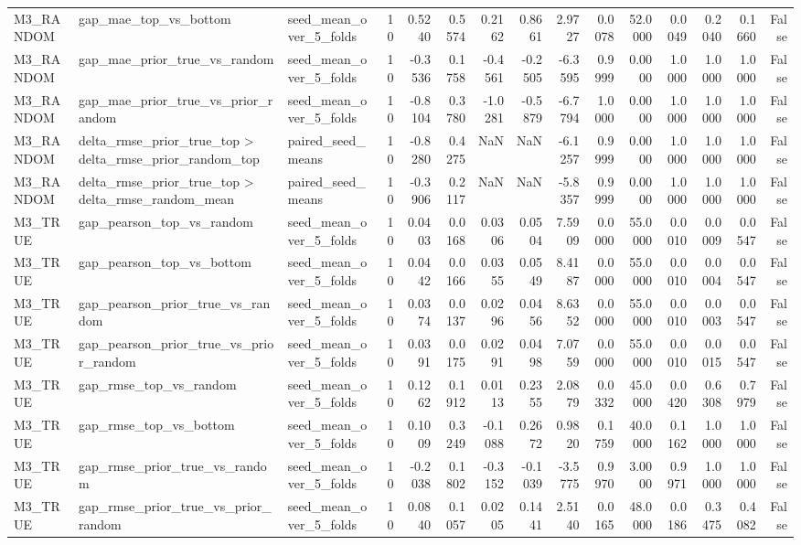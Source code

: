 \begin{tabular}{lllrrrrrrrrrrrr}
M3_RANDOM & gap_mae_top_vs_bottom & seed_mean_over_5_folds & 10 & 0.5240 & 0.5574 & 0.2162 & 0.8661 & 2.9727 & 0.0078 & 52.0000 & 0.0049 & 0.2040 & 0.1660 & False \\
M3_RANDOM & gap_mae_prior_true_vs_random & seed_mean_over_5_folds & 10 & -0.3536 & 0.1758 & -0.4561 & -0.2505 & -6.3595 & 0.9999 & 0.0000 & 1.0000 & 1.0000 & 1.0000 & False \\
M3_RANDOM & gap_mae_prior_true_vs_prior_random & seed_mean_over_5_folds & 10 & -0.8104 & 0.3780 & -1.0281 & -0.5879 & -6.7794 & 1.0000 & 0.0000 & 1.0000 & 1.0000 & 1.0000 & False \\
M3_RANDOM & delta_rmse_prior_true_top > delta_rmse_prior_random_top & paired_seed_means & 10 & -0.8280 & 0.4275 & NaN & NaN & -6.1257 & 0.9999 & 0.0000 & 1.0000 & 1.0000 & 1.0000 & False \\
M3_RANDOM & delta_rmse_prior_true_top > delta_rmse_random_mean & paired_seed_means & 10 & -0.3906 & 0.2117 & NaN & NaN & -5.8357 & 0.9999 & 0.0000 & 1.0000 & 1.0000 & 1.0000 & False \\
M3_TRUE & gap_pearson_top_vs_random & seed_mean_over_5_folds & 10 & 0.0403 & 0.0168 & 0.0306 & 0.0504 & 7.5909 & 0.0000 & 55.0000 & 0.0010 & 0.0009 & 0.0547 & False \\
M3_TRUE & gap_pearson_top_vs_bottom & seed_mean_over_5_folds & 10 & 0.0442 & 0.0166 & 0.0355 & 0.0549 & 8.4187 & 0.0000 & 55.0000 & 0.0010 & 0.0004 & 0.0547 & False \\
M3_TRUE & gap_pearson_prior_true_vs_random & seed_mean_over_5_folds & 10 & 0.0374 & 0.0137 & 0.0296 & 0.0456 & 8.6352 & 0.0000 & 55.0000 & 0.0010 & 0.0003 & 0.0547 & False \\
M3_TRUE & gap_pearson_prior_true_vs_prior_random & seed_mean_over_5_folds & 10 & 0.0391 & 0.0175 & 0.0291 & 0.0498 & 7.0759 & 0.0000 & 55.0000 & 0.0010 & 0.0015 & 0.0547 & False \\
M3_TRUE & gap_rmse_top_vs_random & seed_mean_over_5_folds & 10 & 0.1262 & 0.1912 & 0.0113 & 0.2355 & 2.0879 & 0.0332 & 45.0000 & 0.0420 & 0.6308 & 0.7979 & False \\
M3_TRUE & gap_rmse_top_vs_bottom & seed_mean_over_5_folds & 10 & 0.1009 & 0.3249 & -0.1088 & 0.2672 & 0.9820 & 0.1759 & 40.0000 & 0.1162 & 1.0000 & 1.0000 & False \\
M3_TRUE & gap_rmse_prior_true_vs_random & seed_mean_over_5_folds & 10 & -0.2038 & 0.1802 & -0.3152 & -0.1039 & -3.5775 & 0.9970 & 3.0000 & 0.9971 & 1.0000 & 1.0000 & False \\
M3_TRUE & gap_rmse_prior_true_vs_prior_random & seed_mean_over_5_folds & 10 & 0.0840 & 0.1057 & 0.0205 & 0.1441 & 2.5140 & 0.0165 & 48.0000 & 0.0186 & 0.3475 & 0.4082 & False \\

\end{tabular}
